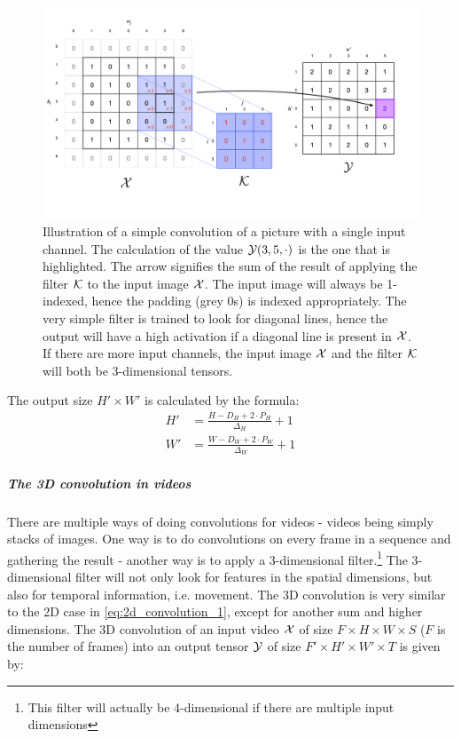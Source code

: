 \begin{figure}
    \centering
    \captionsetup{width=.95\linewidth}
    \includegraphics[width=\linewidth]{Pics/02_Theory/convolution_illustration.png}
    \caption{Illustration of a simple convolution of a picture with a single input channel. The calculation of the value $\mathcal{Y}(3, 5, \cdot)$ is the one that is highlighted. The arrow signifies the sum of the result of applying the filter $\mathcal{K}$ to the input image $\mathcal{X}$. The input image will always be 1-indexed, hence the padding (grey 0s) is indexed appropriately. The very simple filter is trained to look for diagonal lines, hence the output will have a high activation if a diagonal line is present in $\mathcal{X}$. If there are more input channels, the input image $\mathcal{X}$ and the filter $\mathcal{K}$ will both be 3-dimensional tensors.}
    \label{fig:convolution_illustration}
\end{figure}
The output size $H' \times W'$ is calculated by the formula:
\begin{align}
    H' &= \frac{H - D_H + 2\cdot P_H}{\Delta_H} + 1 \label{eq:out_dim_H}\\
    W' &= \frac{W - D_W + 2\cdot P_W}{\Delta_W} + 1 \label{eq:out_dim_W}
\end{align}
\subparagraph{The 3D convolution in videos}
There are multiple ways of doing convolutions for videos - videos being simply stacks of images. One way is to do convolutions on every frame in a sequence and gathering the result - another way is to apply a 3-dimensional filter.\footnote{This filter will actually be 4-dimensional if there are multiple input dimensions} The 3-dimensional filter will not only look for features in the spatial dimensions, but also for temporal information, i.e. movement. The 3D convolution is very similar to the 2D case in \eqref{eq:2d_convolution_1}, except for another sum and higher dimensions. The 3D convolution of an input video $\mathcal{X}$ of size $F\times H \times W \times S$ ($F$ is the number of frames) into an output tensor $\mathcal{Y}$ of size $F'\times H' \times W' \times T$ is given by:
